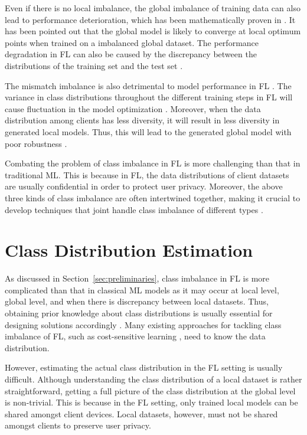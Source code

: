 \documentclass[10pt,journal,compsoc]{IEEEtran}
\begin{document}
Even if there is no local imbalance, the global imbalance of training data can also lead to performance deterioration, which has been mathematically proven in  \cite{duan2019astraea} \cite{zhang2021dubhe}. It has been pointed out that the global model is likely to converge at local optimum points when trained on a imbalanced global dataset. The performance degradation in FL can also be caused by the discrepancy between the distributions of the training set and the test set \cite{duan2019astraea}.

The mismatch imbalance is also detrimental to model performance in FL \cite{wang2020optimizing}. The variance in class distributions throughout the different training steps in FL will cause fluctuation in the model optimization \cite{zhang2021dubhe}. Moreover, when the data distribution among clients has less diversity, it will result in less diversity in generated local models. Thus, this will lead to the generated global model with poor robustness \cite{zhang2021dubhe}.

Combating the problem of class imbalance in FL is more challenging than that in traditional ML. This is because in FL, the data distributions of client datasets are usually confidential in order to protect user privacy. Moreover, the above three kinds of class imbalance are often intertwined together, making it crucial to develop techniques that joint handle class imbalance of different types \cite{li2019convergence} \cite{wang2020tackling} \cite{shen2021agnostic}.
\vspace{-0.2cm}

\section{Class Distribution Estimation}
\label{sec:class_estimation}
As discussed in Section~\ref{sec:preliminaries}, class imbalance in FL is more complicated than that in classical ML models as it may occur at local level, global level, and when there is discrepancy between local datasets. Thus, obtaining prior knowledge about class distributions is usually essential for designing solutions accordingly \cite{chakraborty2022improving}. Many existing approaches for tackling class imbalance of FL, such as cost-sensitive learning \cite{lin2017focal} \cite{wang2016training} \cite{khan2017cost} \cite{wang2018predicting}, need to know the data distribution.

However, estimating the actual class distribution in the FL setting is usually difficult. Although understanding the class distribution of a local dataset is rather straightforward, getting a full picture of the class distribution at the global level is non-trivial. This is because in the FL setting, only trained local models can be shared amongst client devices. Local datasets, however, must not be shared amongst clients to preserve user privacy. %
\end{document}
